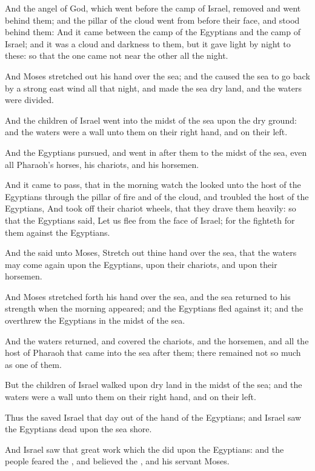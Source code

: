 \verse And the angel of God, which went before the camp of Israel, removed and went behind them; and the pillar of the cloud went from before their face, and stood behind them: \verse And it came between the camp of the Egyptians and the camp of Israel; and it was a cloud and darkness to them, but it gave light by night to these: so that the one came not near the other all the night.

\verse And Moses stretched out his hand over the sea; and the \LORD caused the sea to go back by a strong east wind all that night, and made the sea dry land, and the waters were divided.

\verse And the children of Israel went into the midst of the sea upon the dry ground: and the waters were a wall unto them on their right hand, and on their left.

\verse And the Egyptians pursued, and went in after them to the midst of the sea, even all Pharaoh's horses, his chariots, and his horsemen.

\verse And it came to pass, that in the morning watch the \LORD looked unto the host of the Egyptians through the pillar of fire and of the cloud, and troubled the host of the Egyptians, \verse And took off their chariot wheels, that they drave them heavily: so that the Egyptians said, Let us flee from the face of Israel; for the \LORD fighteth for them against the Egyptians.

\verse And the \LORD said unto Moses, Stretch out thine hand over the sea, that the waters may come again upon the Egyptians, upon their chariots, and upon their horsemen.

\verse And Moses stretched forth his hand over the sea, and the sea returned to his strength when the morning appeared; and the Egyptians fled against it; and the \LORD overthrew the Egyptians in the midst of the sea.

\verse And the waters returned, and covered the chariots, and the horsemen, and all the host of Pharaoh that came into the sea after them; there remained not so much as one of them.

\verse But the children of Israel walked upon dry land in the midst of the sea; and the waters were a wall unto them on their right hand, and on their left.

\verse Thus the \LORD saved Israel that day out of the hand of the Egyptians; and Israel saw the Egyptians dead upon the sea shore.

\verse And Israel saw that great work which the \LORD did upon the Egyptians: and the people feared the \LORD, and believed the \LORD, and his servant Moses.

